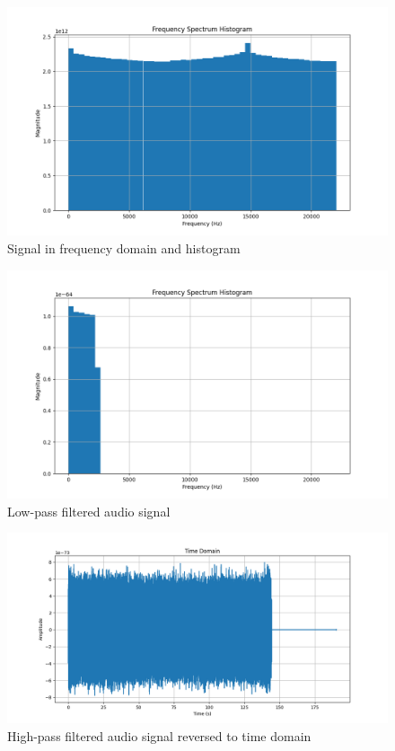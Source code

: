 \documentclass[a4paper,12pt,fleqn]{article}
\begin{document}
\begin{figure}[H]
    \centering
    \includegraphics[width=1\textwidth]{ex3_spectrum_histogram.png}
    \caption{Signal in frequency domain and histogram}
    \label{fig:ex3_hist}
\end{figure}
\begin{figure}[H]
    \centering
    \includegraphics[width=1\textwidth]{ex3_low_pass_filter.png}
    \caption{Low-pass filtered audio signal}
    \label{fig:ex3_low}
\end{figure}
\begin{figure}[H]
    \centering
    \includegraphics[width=1\textwidth]{ex3_low_pass_filter_time_domain.png}
    \caption{High-pass filtered audio signal reversed to time domain}
    \label{fig:ex3_low_hist}
\end{figure}
\end{document}
